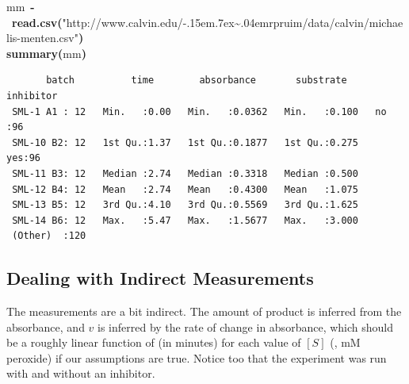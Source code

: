 \documentclass{article}
\makeatletter
\newcommand{\hlfunctioncall}[1]{\textcolor[rgb]{0.501960784313725,0,0.329411764705882}{\textbf{#1}}}%
\newcommand{\hlstring}[1]{\textcolor[rgb]{0.6,0.6,1}{#1}}%
\newcommand{\hlkeyword}[1]{\textcolor[rgb]{0,0,0}{\textbf{#1}}}%
\newcommand{\hlassignement}[1]{\textcolor[rgb]{0,0,0}{\textbf{#1}}}%
\newcommand{\hlsymbol}[1]{\textcolor[rgb]{0,0,0}{#1}}%
\def\urltilda{\kern -.15em\lower .7ex\hbox{\~{}}\kern .04em}%
\newcommand{\hlstd}[1]{\textcolor[rgb]{0,0,0}{#1}}%
\newenvironment{kframe}{%
 \def\FrameCommand##1{\hskip\@totalleftmargin \hskip-\fboxsep
 \colorbox{shadecolor}{##1}\hskip-\fboxsep
     \hskip-\linewidth \hskip-\@totalleftmargin \hskip\columnwidth}%
 \MakeFramed {\advance\hsize-\width
   \@totalleftmargin\z@ \linewidth\hsize
   \@setminipage}}%
 {\par\unskip\endMakeFramed}
\newenvironment{knitrout}{}{} %
\makeatother
\begin{document}
\begin{knitrout}
\color{fgcolor}\begin{kframe}
\begin{flushleft}
\ttfamily\noindent
\hlsymbol{mm}{\ }\hlassignement{\usebox{\hlnormalsizeboxlessthan}-}{\ }\hlfunctioncall{read.csv}\hlkeyword{(}\hlstring{"{}http://www.calvin.edu/\urltilda{}rpruim/data/calvin/michaelis-menten.csv"{}}\hlkeyword{)}\hspace*{\fill}\\
\hlstd{}\hlfunctioncall{summary}\hlkeyword{(}\hlsymbol{mm}\hlkeyword{)}\mbox{}
\normalfont
\end{flushleft}
\begin{verbatim}
       batch          time        absorbance       substrate     inhibitor
 SML-1 A1 : 12   Min.   :0.00   Min.   :0.0362   Min.   :0.100   no :96   
 SML-10 B2: 12   1st Qu.:1.37   1st Qu.:0.1877   1st Qu.:0.275   yes:96   
 SML-11 B3: 12   Median :2.74   Median :0.3318   Median :0.500            
 SML-12 B4: 12   Mean   :2.74   Mean   :0.4300   Mean   :1.075            
 SML-13 B5: 12   3rd Qu.:4.10   3rd Qu.:0.5569   3rd Qu.:1.625            
 SML-14 B6: 12   Max.   :5.47   Max.   :1.5677   Max.   :3.000            
 (Other)  :120                                                            
\end{verbatim}
\end{kframe}
\end{knitrout}


\subsection{Dealing with Indirect Measurements}
The measurements are a bit indirect.  The amount of product is inferred from
the absorbance, and $v$ is inferred by the rate of change in absorbance, which
should be a roughly linear function of  (in minutes) for each
value of $[S]$ (, mM peroxide) if our assumptions are true.
Notice too that the experiment was run with and without an inhibitor.
\end{document}

